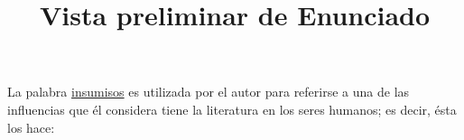 \documentclass[a4paper,12pt]{article}\usepackage[utf8]{inputenc}\usepackage[spanish]{babel}\usepackage{times}
\title{Vista preliminar de Enunciado}
\begin{document}
\twocolumn 

\maketitle

La palabra \underline{ insumisos} es utilizada por el autor para referirse a una de las influencias que él considera tiene la literatura en los seres humanos; es decir, ésta los hace:
\end{document}
